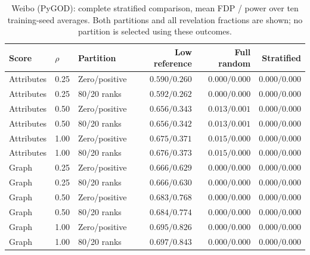 \begin{table}[t]\centering\small
\caption{Weibo (PyGOD): complete stratified comparison, mean FDP / power over ten training-seed averages. Both partitions and all revelation fractions are shown; no partition is selected using these outcomes.}
\begin{tabular}{lllrrr}\toprule Score & $\rho$ & Partition & Low reference & Full random & Stratified\\\midrule
Attributes & 0.25 & Zero/positive & $0.590/0.260$ & $0.000/0.000$ & $0.000/0.000$ \\
Attributes & 0.25 & 80/20 ranks & $0.592/0.262$ & $0.000/0.000$ & $0.000/0.000$ \\
Attributes & 0.50 & Zero/positive & $0.656/0.343$ & $0.013/0.001$ & $0.000/0.000$ \\
Attributes & 0.50 & 80/20 ranks & $0.656/0.342$ & $0.013/0.001$ & $0.000/0.000$ \\
Attributes & 1.00 & Zero/positive & $0.675/0.371$ & $0.015/0.000$ & $0.000/0.000$ \\
Attributes & 1.00 & 80/20 ranks & $0.676/0.373$ & $0.015/0.000$ & $0.000/0.000$ \\
Graph & 0.25 & Zero/positive & $0.666/0.629$ & $0.000/0.000$ & $0.000/0.000$ \\
Graph & 0.25 & 80/20 ranks & $0.666/0.630$ & $0.000/0.000$ & $0.000/0.000$ \\
Graph & 0.50 & Zero/positive & $0.683/0.768$ & $0.000/0.000$ & $0.000/0.000$ \\
Graph & 0.50 & 80/20 ranks & $0.684/0.774$ & $0.000/0.000$ & $0.000/0.000$ \\
Graph & 1.00 & Zero/positive & $0.695/0.826$ & $0.000/0.000$ & $0.000/0.000$ \\
Graph & 1.00 & 80/20 ranks & $0.697/0.843$ & $0.000/0.000$ & $0.000/0.000$ \\
\bottomrule\end{tabular}\end{table}

